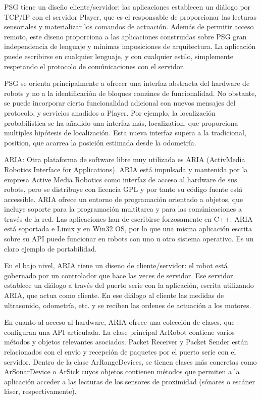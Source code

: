 \begin{itemize}
	PSG tiene un diseño cliente/servidor: las aplicaciones establecen un diálogo por TCP/IP con el servidor Player, que es el responsable de proporcionar las lecturas sensoriales y materializar los comandos de actuación. Además de permitir acceso remoto, este diseno proporciona a las aplicaciones construidas sobre PSG gran independencia de lenguaje y mínimas imposiciones de arquitectura. La aplicación puede escribirse en cualquier lenguaje, y con cualquier estilo, simplemente respetando el protocolo de comúnicaciones con el servidor.

	PSG se orienta principalmente a ofrecer una interfaz abstracta del hardware de robots y no a la identificación de bloques comúnes de funcionalidad. No obstante, se puede incorporar cierta funcionalidad adicional con nuevos mensajes del protocolo, y servicios anadidos a Player. Por ejemplo, la localización probabilística se ha añadido una interfaz más, localization, que proporciona multiples hipótesis de localización. Esta nueva interfaz supera a la tradicional, position, que acarrea la posición estimada desde la odometría.

	ARIA: Otra plataforma de software libre muy utilizada es ARIA (ActivMedia Robotics Interface for Applications). ARIA está impulsada y mantenida por la empresa Active Media Robotics como interfaz de acceso al hardware de sus robots, pero se distribuye con licencia GPL y por tanto su código fuente está accessible. ARIA ofrece un entorno de programación orientado a objetos, que incluye soporte para la programación multitarea y para las comúnicaciones a través de la red. Las aplicaciones han de escribirse forzosamente en C++. ARIA está soportada e Linux y en Win32 OS, por lo que una misma aplicación escrita sobre su API puede funcionar en robots con uno u otro sistema operativo. Es un claro ejemplo de portabilidad.

	En el bajo nivel, ARIA tiene un diseno de cliente/servidor: el robot está gobernado por un controlador que hace las veces de servidor. Ese servidor establece un diálogo a través del puerto serie con la aplicación, escrita utilizando ARIA, que actua como cliente. En ese diálogo al cliente las medidas de ultrasonido, odometría, etc. y se reciben las ordenes de actuación a los motores.

	En cuanto al acceso al hardware, ARIA ofrece una colección de clases, que configuran una API articulada. La clase principal ArRobot contiene varios métodos y objetos relevantes asociados. Packet Receiver y Packet Sender están relacionados con el envío y recepción de paquetes por el puerto serie con el servidor. Dentro de la clase ArRangeDevices, se tienen clases más concretas como ArSonarDevice o ArSick cuyos objetos contienen métodos que permiten a la aplicación acceder a las lecturas de los sensores de proximidad (sónares o escáner láser, respectivamente).


\end{itemize}
